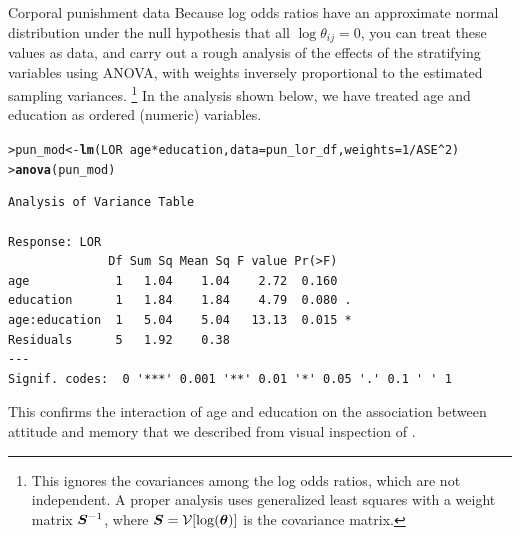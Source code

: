 \documentclass[10pt,krantz2]{krantz}\usepackage[]{graphicx}\usepackage[]{color}
\makeatletter
\newcommand{\hlnum}[1]{\textcolor[rgb]{0.686,0.059,0.569}{#1}}%
\newcommand{\hlopt}[1]{\textcolor[rgb]{0,0,0}{#1}}%
\newcommand{\hlstd}[1]{\textcolor[rgb]{0.345,0.345,0.345}{#1}}%
\newcommand{\hlkwb}[1]{\textcolor[rgb]{0.69,0.353,0.396}{#1}}%
\newcommand{\hlkwc}[1]{\textcolor[rgb]{0.333,0.667,0.333}{#1}}%
\newcommand{\hlkwd}[1]{\textcolor[rgb]{0.737,0.353,0.396}{\textbf{#1}}}%
\newenvironment{kframe}{%
 \def\at@end@of@kframe{}%
 \ifinner\ifhmode%
  \def\at@end@of@kframe{\end{minipage}}%
  \begin{minipage}{\columnwidth}%
 \fi\fi%
 \def\FrameCommand##1{\hskip\@totalleftmargin \hskip-\fboxsep
 \colorbox{shadecolor}{##1}\hskip-\fboxsep
     \hskip-\linewidth \hskip-\@totalleftmargin \hskip\columnwidth}%
 \MakeFramed {\advance\hsize-\width
   \@totalleftmargin\z@ \linewidth\hsize
   \@setminipage}}%
 {\par\unskip\endMakeFramed%
 \at@end@of@kframe}
\newenvironment{knitrout}{}{} %
\renewenvironment{knitrout}{\small\renewcommand{\baselinestretch}{.85}}{} %
\makeatother
\begin{document}
\begin{Example}[punish2]{Corporal punishment data}
Because log odds ratios have an approximate normal distribution under the null hypothesis that
all $\log \theta_{ij} =0$, you can treat these values as data, and carry out a rough analysis
of the effects of the stratifying variables using ANOVA, with weights inversely proportional to the
estimated sampling variances.%
\footnote{
This ignores the covariances among the log odds ratios, which are not independent.
A proper analysis uses generalized least squares
with a weight matrix $\bm{S}^{-1}$, where $\bm{S} = \mathcal{V} [\log (\bm{\theta})]$ is the covariance matrix. 
}
In the analysis shown below, we have treated age and education as
ordered (numeric) variables.


\begin{knitrout}
\color{fgcolor}\begin{kframe}
\begin{alltt}
\hlstd{> }\hlstd{pun_mod} \hlkwb{<-} \hlkwd{lm}\hlstd{(LOR} \hlopt{~} \hlstd{age} \hlopt{*} \hlstd{education,} \hlkwc{data} \hlstd{= pun_lor_df,} \hlkwc{weights} \hlstd{=} \hlnum{1} \hlopt{/} \hlstd{ASE}\hlopt{^}\hlnum{2}\hlstd{)}
\hlstd{> }\hlkwd{anova}\hlstd{(pun_mod)}
\end{alltt}
\begin{verbatim}
Analysis of Variance Table

Response: LOR
              Df Sum Sq Mean Sq F value Pr(>F)  
age            1   1.04    1.04    2.72  0.160  
education      1   1.84    1.84    4.79  0.080 .
age:education  1   5.04    5.04   13.13  0.015 *
Residuals      5   1.92    0.38                 
---
Signif. codes:  0 '***' 0.001 '**' 0.01 '*' 0.05 '.' 0.1 ' ' 1
\end{verbatim}
\end{kframe}
\end{knitrout}
This confirms the interaction of age and education on the association between attitude and
memory that we described from visual inspection of .
\end{Example}
\end{document}

